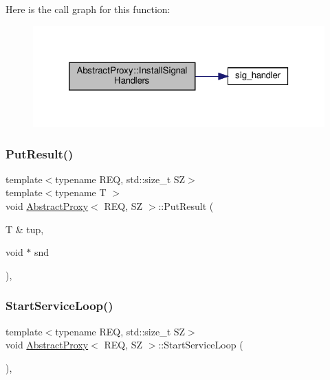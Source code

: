 Here is the call graph for this function\+:
\nopagebreak
\begin{figure}[H]
\begin{center}
\leavevmode
\includegraphics[width=320pt]{classAbstractProxy_a9f368f0e76ba153626f0db982ebe389c_cgraph}
\end{center}
\end{figure}
\mbox{\label{classAbstractProxy_ad3f858bad58a93f75984d2d0a5bc9081}} 
\subsubsection{\texorpdfstring{Put\+Result()}{PutResult()}}
{\footnotesize\ttfamily template$<$typename R\+EQ, std\+::size\+\_\+t SZ$>$ \\
template$<$typename T $>$ \\
void \hyperlink{classAbstractProxy}{Abstract\+Proxy}$<$ R\+EQ, SZ $>$\+::Put\+Result (\begin{DoxyParamCaption}\item[{T \&}]{tup,  }\item[{void $\ast$}]{snd }\end{DoxyParamCaption})\hspace{0.3cm}{\ttfamily [inline]}, {\ttfamily [protected]}}

\mbox{\label{classAbstractProxy_ae0ce7181a041a8845a114f7f1c6768bf}} 
\subsubsection{\texorpdfstring{Start\+Service\+Loop()}{StartServiceLoop()}}
{\footnotesize\ttfamily template$<$typename R\+EQ, std\+::size\+\_\+t SZ$>$ \\
void \hyperlink{classAbstractProxy}{Abstract\+Proxy}$<$ R\+EQ, SZ $>$\+::Start\+Service\+Loop (\begin{DoxyParamCaption}{ }\end{DoxyParamCaption})\hspace{0.3cm}{\ttfamily [inline]}, {\ttfamily [protected]}}

